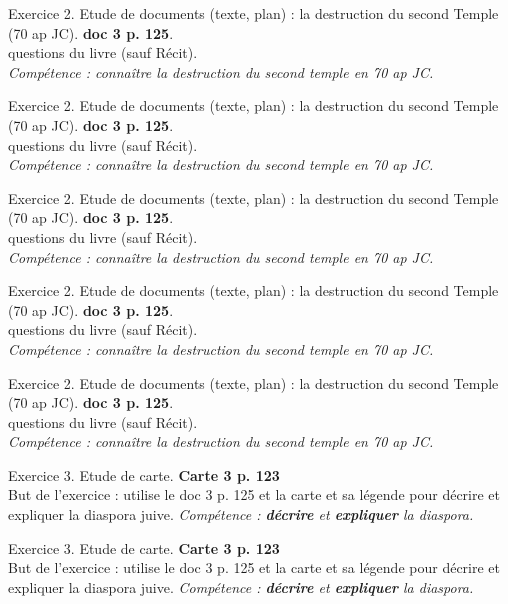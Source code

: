 \documentclass[12pt]{article}
\begin{document}
\vfill

{\large Exercice 2. Etude de documents (texte, plan) : la destruction du second Temple (70 ap JC)}. \textbf{doc 3 p. 125}.\\
questions du livre (sauf Récit).\\
\textit{{\small Compétence : connaître la destruction du second temple en 70 ap JC.}}

\vfill

{\large Exercice 2. Etude de documents (texte, plan) : la destruction du second Temple (70 ap JC)}. \textbf{doc 3 p. 125}.\\
questions du livre (sauf Récit).\\
\textit{{\small Compétence : connaître la destruction du second temple en 70 ap JC.}}

\vfill

{\large Exercice 2. Etude de documents (texte, plan) : la destruction du second Temple (70 ap JC)}. \textbf{doc 3 p. 125}.\\
questions du livre (sauf Récit).\\
\textit{{\small Compétence : connaître la destruction du second temple en 70 ap JC.}}

\vfill

{\large Exercice 2. Etude de documents (texte, plan) : la destruction du second Temple (70 ap JC)}. \textbf{doc 3 p. 125}.\\
questions du livre (sauf Récit).\\
\textit{{\small Compétence : connaître la destruction du second temple en 70 ap JC.}}

\vfill

{\large Exercice 2. Etude de documents (texte, plan) : la destruction du second Temple (70 ap JC)}. \textbf{doc 3 p. 125}.\\
questions du livre (sauf Récit).\\
\textit{{\small Compétence : connaître la destruction du second temple en 70 ap JC.}}

\vfill

\newpage
{\large Exercice 3. Etude de carte.} \textbf{Carte 3 p. 123} \\
But de l'exercice : utilise le doc 3 p. 125 et la carte et sa légende pour décrire et expliquer la diaspora juive.
{\small \textit{Compétence : \textbf{décrire} et \textbf{expliquer} la diaspora.}}

\vfill

{\large Exercice 3. Etude de carte.} \textbf{Carte 3 p. 123} \\
But de l'exercice : utilise le doc 3 p. 125 et la carte et sa légende pour décrire et expliquer la diaspora juive.
{\small \textit{Compétence : \textbf{décrire} et \textbf{expliquer} la diaspora.}}
\end{document}
